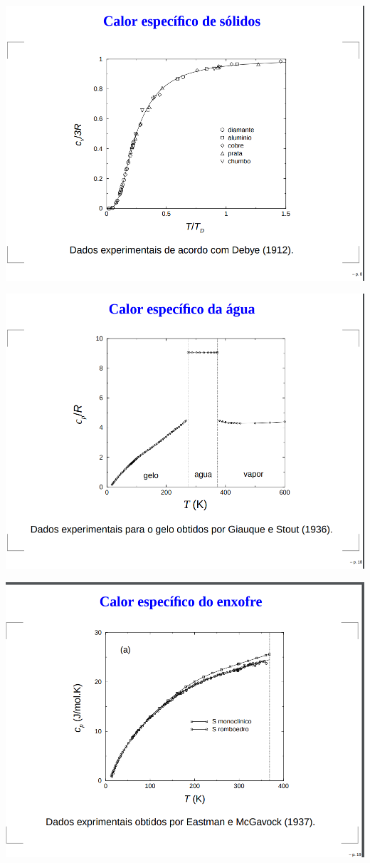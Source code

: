 \documentclass[t,%
brazilian,%
11pt,%
aspectratio=169,%
table%
]{beamer}
\begin{document}
 \begin{frame}
     \centering
     \includegraphics[height=\textheight-10pt]{images/Captura de tela de 2023-05-24 13-10-31.png}
 \end{frame}
 \begin{frame}
     \centering
     \includegraphics[height=\textheight-10pt]{images/Captura de tela de 2023-05-24 13-16-35.png}
 \end{frame}
 \begin{frame}
     \centering
     \includegraphics[height=\textheight-10pt]{images/Captura de tela de 2023-05-24 13-19-17.png}
 \end{frame}
\end{document}
